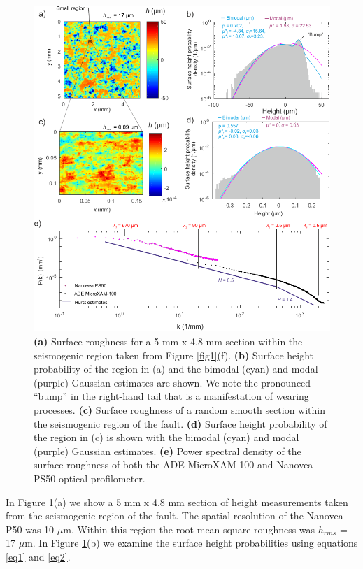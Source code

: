 \documentclass[draft]{agujournal2019}
\begin{document}
\begin{figure}
	\centering
	\includegraphics{FIG2.pdf} 
	\caption{\textbf{(a)} Surface roughness for a 5 mm x 4.8 mm section within the seismogenic region taken from Figure \ref{fig1}(f). \textbf{(b)} Surface height probability of the region in (a) and the bimodal (cyan) and modal (purple) Gaussian estimates are shown. We note the pronounced ``bump'' in the right-hand tail that is a manifestation of wearing processes. \textbf{(c)} Surface roughness of a random smooth section within the seismogenic region of the fault. \textbf{(d)} Surface height probability of the region in (c) is shown with the bimodal (cyan) and modal (purple) Gaussian estimates. \textbf{(e)}  Power spectral density of the surface roughness of both the ADE MicroXAM-100 and Nanovea PS50 optical profilometer. }
	\label{fig2}
\end{figure}

In Figure \ref{fig2}(a) we show a 5 mm x 4.8 mm section of height measurements taken from the seismogenic region of the fault. The spatial resolution of the Nanovea P50 was 10 $\mu$m.  Within this region the root mean square roughness was $h_{rms}$ = 17 $\mu$m. In Figure \ref{fig2}(b) we examine the surface height probabilities using equations \eqref{eq1} and \eqref{eq2}.
\end{document}
